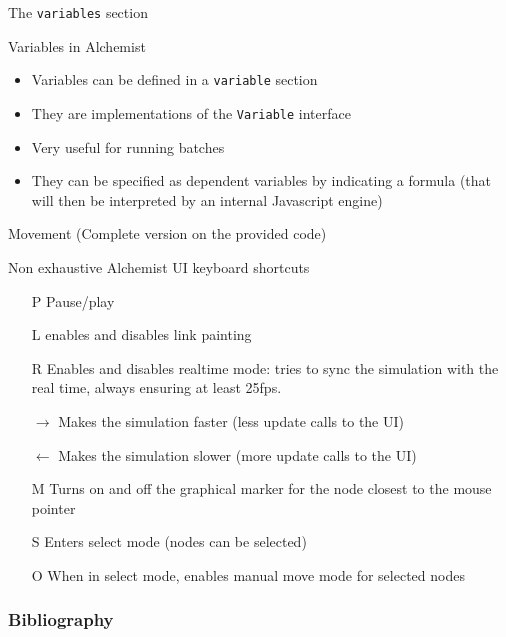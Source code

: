 \documentclass[presentation]{beamer}
\begin{document}
\begin{frame}[fragile]{The \texttt{variables} section}
\end{frame}

\begin{frame}[fragile]{Variables in Alchemist}
	\begin{itemize}
	  \item Variables can be defined in a \texttt{variable} section
	  \item They are implementations of the \texttt{Variable} interface
	  \item Very useful for running batches
	  \item They can be specified as dependent variables by indicating a formula (that will then be interpreted by an internal Javascript engine)
	\end{itemize}
\end{frame}


\begin{frame}[fragile]{Movement}
	(Complete version on the provided code)
\end{frame}

\begin{frame}[fragile]{Non exhaustive Alchemist UI keyboard shortcuts}
	\begin{itemize}
	  \item[P] Pause/play
	  \item[L] enables and disables link painting
	  \item[R] Enables and disables realtime mode: tries to sync the simulation with the real time, always ensuring at least 25fps.
	  \item[$\rightarrow{}$] Makes the simulation faster (less update calls to the UI)
	  \item[$\leftarrow{}$] Makes the simulation slower (more update calls to the UI)
	  \item[M] Turns on and off the graphical marker for the node closest to the mouse pointer
	  \item[S] Enters select mode (nodes can be selected)
	  \item[O] When in select mode, enables manual move mode for selected nodes
	\end{itemize}
\end{frame}


\begin{frame}[allowframebreaks]
  \frametitle{Bibliography}
  
  
\end{frame}
\end{document}
